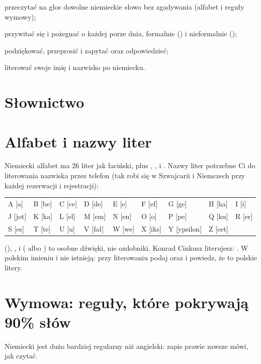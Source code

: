 \begin{candos}
\item przeczytać na głos dowolne niemieckie słowo bez zgadywania (alfabet i reguły wymowy);
\item przywitać się i pożegnać o każdej porze dnia, formalnie () i nieformalnie ();
\item podziękować, przeprosić i zapytać  oraz odpowiedzieć;
\item literować swoje imię i nazwisko po niemiecku.
\end{candos}

\section{Słownictwo}

\section{Alfabet i nazwy liter}
Niemiecki alfabet ma 26 liter jak łaciński, plus , ,  i . Nazwy liter
potrzebne Ci do literowania nazwiska przez telefon (tak robi się w Szwajcarii i Niemczech przy
każdej rezerwacji i rejestracji):

\begin{center}\small
\begin{tabular}{@{}*{9}{l}@{}}
A [a] & B [be] & C [ce] & D [de] & E [e] & F [ef] & G [ge] & H [ha] & I [i]\\
J [jot] & K [ka] & L [el] & M [em] & N [en] & O [o] & P [pe] & Q [ku] & R [er]\\
S [es] & T [te] & U [u] & V [fał] & W [we] & X [iks] & Y [ypsilon] & Z [cet] & \\
\end{tabular}
\end{center}

 (), ,  i  ( albo ) to osobne dźwięki,
nie ozdobniki. Konrad Cinkusz literujesz: . W polskim imieniu  i  nie
istnieją: przy literowaniu podaj  oraz  i powiedz, że to polskie litery.

\section{Wymowa: reguły, które pokrywają 90\% słów}
Niemiecki jest dużo bardziej regularny niż angielski: zapis prawie zawsze mówi, jak czytać.

